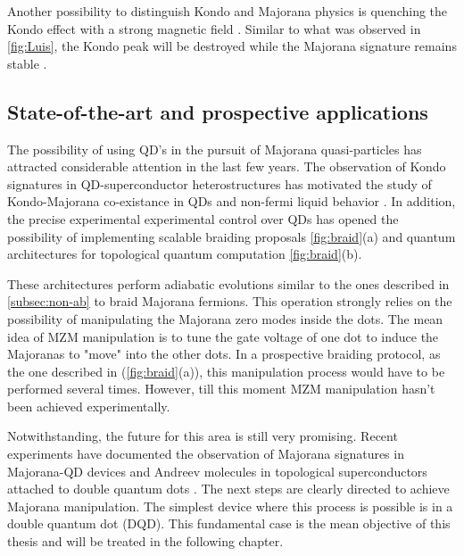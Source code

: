  


Another possibility to distinguish Kondo and Majorana physics is quenching the Kondo effect with a strong magnetic field . Similar to what was observed in \ref{fig:Luis}, the Kondo peak will be destroyed while the Majorana signature remains stable \cite{ruiz-tijerina_interaction_2015}. 




\subsection{State-of-the-art and prospective applications}

The possibility of using QD's in the pursuit of Majorana quasi-particles has attracted considerable attention in the last few years. The observation of Kondo signatures in QD-superconductor heterostructures \cite{deng_anomalous_2012} has motivated the study of Kondo-Majorana co-existance in QDs \cite{ruiz-tijerina_interaction_2015,gorski_interplay_2018} and non-fermi liquid behavior \cite{zitko_quantum_2011}. In addition, the precise experimental experimental control over QDs has opened the possibility of implementing scalable braiding proposals \ref{fig:braid}(a) and  quantum architectures for topological quantum computation \ref{fig:braid}(b). 

These architectures perform adiabatic evolutions similar to the ones described in  \ref{subsec:non-ab} to braid Majorana fermions. This operation strongly relies on the possibility of manipulating the Majorana zero modes inside the dots. The mean idea of MZM manipulation is to  tune the gate voltage of one dot to induce the Majoranas to "move" into the other dots.  In a prospective braiding protocol, as the one described in  \cite{malciu_braiding_2018} (\ref{fig:braid}(a)), this manipulation process would have to be performed several times. However, till this moment MZM manipulation hasn't been achieved experimentally. 


Notwithstanding, the future for this area is still very promising. Recent experiments have documented the observation of Majorana signatures in Majorana-QD devices \cite{deng_majorana_2016} and Andreev molecules in topological superconductors attached to double quantum dots \cite{su_andreev_2017}. The next steps are clearly directed to achieve Majorana manipulation. The simplest device where this process is possible is in a double quantum dot (DQD). This fundamental case is the mean objective of this thesis and will be treated in the following chapter. 

